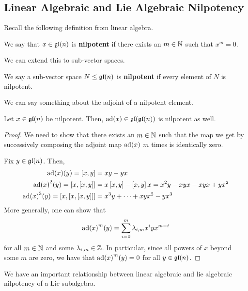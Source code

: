 \subsection{Linear Algebraic and Lie Algebraic Nilpotency}

Recall the following definition from linear algebra.

\begin{boxdefinition}
    We say that $x \in \mathfrak{gl}\!\left( n \right)$ is \textbf{nilpotent} if there exists an $m \in \mathbb{N}$ such that $x^m = 0$. 
\end{boxdefinition}

We can extend this to sub-vector spaces.

\begin{boxdefinition}
    We say a sub-vector space $N \leq \mathfrak{gl}\!\left( n \right)$ is \textbf{nilpotent} if every element of $N$ is nilpotent.
\end{boxdefinition}

We can say something about the adjoint of a nilpotent element.

\begin{boxlemma}\label{Ch1:Lemma:adNilpotnetOfNilpotent}
    Let $x \in \mathfrak{gl}\!\left( n \right)$ be nilpotent. Then, $\operatorname{ad}\!\left( x \right) \in \mathfrak{gl}\!\left( \mathfrak{gl}\!\left( n \right) \right)$ is nilpotent as well.
\end{boxlemma}
\begin{proof}
    We need to show that there exists an $m \in \mathbb{N}$ such that the map we get by successively composing the adjoint map $\operatorname{ad}\!\left( x \right)$ $m$ times is identically zero.
    
    Fix $y \in \mathfrak{gl}\!\left( n \right)$. Then,
    \begin{align*}
        \operatorname{ad}\!\left( x \right)\!(y) = \left[ x, y \right] &= xy - yx \\
        \operatorname{ad}\!\left( x \right)^2\!(y) = \left[ x, \left[ x, y \right] \right] &= x\left[ x, y \right] - \left[ x, y \right]x = x^2y - xyx - xyx + yx^2 \\
        \operatorname{ad}\!\left( x \right)^3\!(y) = \left[ x, \left[ x, \left[ x, y \right] \right] \right] &= x^3y + \cdots + xyx^2 - yx^3
    \end{align*}
    More generally, one can show that
    \begin{align*}
        \operatorname{ad}\!\left( x \right)^m\!(y) = \sum_{i = 0}^{m} \lambda_{i, m} x^i y x^{m - i}
    \end{align*}
    for all $m \in \mathbb{N}$ and some $\lambda_{i, m} \in \mathbb{Z}$. In particular, since all powers of $x$ beyond some $m$ are zero, we have that $\operatorname{ad}\!\left( x \right)^m\!(y) = 0$ for all $y \in \mathfrak{gl}\!\left( n \right)$.
\end{proof}

We have an important relationship between linear algebraic and lie algebraic nilpotency of a Lie subalgebra.

